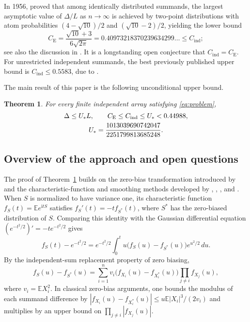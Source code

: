 \documentclass[11pt]{article}
\numberwithin{equation}{section}
\newtheorem{theorem}{Theorem}[section]
\theoremstyle{remark}
\newcommand{\E}{\mathbb E}
\newcommand{\CE}{C_{\mathrm E}}
\newcommand{\Cind}{C_{\mathrm{ind}}}
\newcommand{\ii}{\mathrm i}
\begin{document}
In 1956, \citet{Esseen1956} proved that among identically distributed
summands, the largest asymptotic value of $\Delta/L$ as $n\to\infty$ is
achieved by two-point distributions with atom probabilities
$(4-\sqrt{10})/2$ and $(\sqrt{10}-2)/2$, yielding the lower bound
\begin{equation}\label{eq:esseen}
  \CE=\frac{\sqrt{10}+3}{6\sqrt{2\pi}}
      =0.40973218370239634299\ldots\le\Cind;
\end{equation}
see also the discussion in \citet{Shevtsova2012}. It is a longstanding open
conjecture that $\Cind=\CE$. For unrestricted independent summands, the
best previously published upper bound is $\Cind\le0.5583$, due to
\citet{Shevtsova2013}.

The main result of this paper is the following unconditional upper bound.

\begin{theorem}\label{thm:upper-bound}
For every finite independent array satisfying \eqref{eq:problem},
\begin{equation}\label{eq:upper-bound}
  \begin{gathered}
   \Delta\le U_*L,\qquad \CE\le\Cind\le U_*<\UpperBound,\\
   U_*=\ExactUpper.
  \end{gathered}
\end{equation}
\end{theorem}

\subsection{Overview of the approach and open questions}

The proof of Theorem~\ref{thm:upper-bound} builds on the zero-bias
transformation introduced by \citet{GoldsteinReinert1997} and the
characteristic-function and smoothing methods developed by \citet{Prawitz1972,Prawitz1975},
\citet{Tyurin2009}, \citet{Goldstein2010}, and \citet{Shevtsova2012}.
When $S$ is normalized to have variance one, its characteristic function
$f_S(t)=\E e^{\ii tS}$ satisfies $f_S'(t)=-tf_{S^*}(t)$, where $S^*$ has the
zero-biased distribution of $S$. Comparing this identity with the Gaussian
differential equation $(e^{-t^2/2})'=-te^{-t^2/2}$ gives
\[
  f_S(t)-e^{-t^2/2}
  =e^{-t^2/2}\int_0^t u\bigl(f_S(u)-f_{S^*}(u)\bigr)e^{u^2/2}\,du.
\]
By the independent-sum replacement property of zero biasing,
\[
  f_S(u)-f_{S^*}(u)
  =\sum_{i=1}^n v_i\bigl(f_{X_i}(u)-f_{X_i^*}(u)\bigr)\prod_{j\ne i}f_{X_j}(u),
\]
where $v_i=\E X_i^2$. In classical zero-bias arguments, one bounds the
modulus of each summand difference by $|f_{X_i}(u)-f_{X_i^*}(u)|\le u\E|X_i|^3/(2v_i)$
and multiplies by an upper bound on $\prod_{j\ne i}|f_{X_j}(u)|$.
\end{document}
